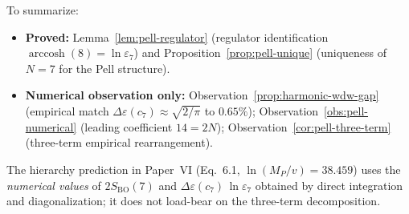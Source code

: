 \begin{remark}
\label{rem:pell-status}
To summarize:
\begin{itemize}
\item \textbf{Proved:}
Lemma~\ref{lem:pell-regulator} (regulator identification
$\operatorname{arccosh}(8) = \ln\varepsilon_7$) and
Proposition~\ref{prop:pell-unique} (uniqueness of $N = 7$
for the Pell structure).
\item \textbf{Numerical observation only:}
Observation~\ref{prop:harmonic-wdw-gap} (empirical match
$\Delta\varepsilon(c_7) \approx \sqrt{2/\pi}$ to $0.65\%$);
Observation~\ref{obs:pell-numerical} (leading coefficient
$14 = 2N$); Observation~\ref{cor:pell-three-term}
(three-term empirical rearrangement).
\end{itemize}
The hierarchy prediction in Paper~VI
(Eq.~6.1, $\ln(M_P/v) = 38.459$) uses the \emph{numerical
values} of $2S_{\mathrm{BO}}(7)$ and
$\Delta\varepsilon(c_7)\,\ln\varepsilon_7$ obtained by
direct integration and diagonalization; it does not
load-bear on the three-term decomposition.
\end{remark}






